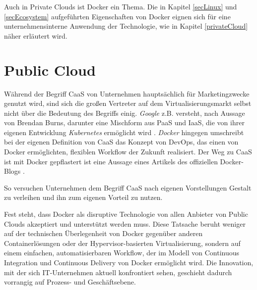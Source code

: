 \documentclass[../main.tex]{subfiles}
\begin{document}
  Auch in Private Clouds ist Docker ein Thema. Die in Kapitel \ref{secLinux} und \ref{secEcosystem} aufgeführten Eigenschaften von Docker eignen sich für eine unternehmensinterne Anwendung der Technologie, wie in Kapitel \ref{privateCloud} näher erläutert wird.




  \section{Public Cloud}
  \label{publicCloud}
    Während der Begriff CaaS von Unternehmen hauptsächlich für Marketingzwecke genutzt wird, sind sich die großen Vertreter auf dem Virtualisierungsmarkt selbst nicht über die Bedeutung des Begriffs einig. \emph{Google} z.B. versteht, nach Aussage von Brendan Burns, darunter eine Mischform aus PaaS und IaaS, die von ihrer eigenen Entwicklung \emph{Kubernetes} ermöglicht wird \cite[S.12]{slideshareContainerKubernetes}.
    \emph{Docker} hingegen umschreibt bei der eigenen Definition von CaaS das Konzept von DevOps, das einen von Docker ermöglichten, flexiblen Workflow der Zukunft realisiert. \glqq{}Der Weg zu CaaS ist mit Docker gepflastert \grqq{} ist eine Aussage eines Artikels des offiziellen Docker-Blogs \cite{dockerCAAS}.

    So versuchen Unternehmen dem Begriff CaaS nach eigenen Vorstellungen Gestalt zu verleihen und ihn zum eigenen Vorteil zu nutzen.

    Fest steht, dass Docker als disruptive Technologie von allen Anbieter von Public Clouds akzeptiert und unterstützt werden muss. Diese Tatsache beruht weniger auf der technischen Überlegenheit von Docker gegenüber anderen Containerlösungen oder der Hypervisor-basierten Virtualisierung, sondern auf einem einfachen, automatisierbaren Workflow, der im Modell von Continuous Integration und Continuous Delivery von Docker ermöglicht wird. Die Innovation, mit der sich IT-Unternehmen aktuell konfrontiert sehen, geschieht dadurch vorrangig auf Prozess- und Geschäftsebene.
\end{document}
